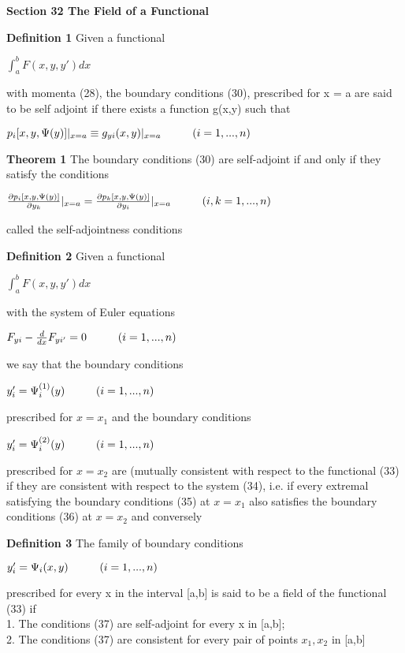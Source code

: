 \documentclass{article}
\newcommand\tab[1][1cm]{\hspace*{#1}}
\begin{document}
\textbf {Section 32 The Field of a Functional}

\textbf {Definition 1} Given a functional
\begin{center}
$\int_a^b F(x, y, y') dx$
\end{center}
with momenta (28), the boundary conditions (30), prescribed for x = a are said to be self adjoint if there exists a function g(x,y) such that 
\begin{center}
$p_i[x,y, \Psi(y)]|_{x=a} \equiv g_{yi}(x,y)|_{x=a} \tab (i = 1,...,n)$
\end{center}

\textbf {Theorem 1} The boundary conditions (30) are self-adjoint if and only if they satisfy the conditions
\begin{center}
$\frac{\partial p_i [x, y, \Psi(y)]}{\partial y_k} |_{x=a} = \frac{\partial p_k [x, y, \Psi(y)]}{\partial y_i} |_{x = a} \tab (i, k = 1,...,n)$
\end{center}
called the self-adjointness conditions

\textbf {Definition 2} Given a functional
\begin{center}
$\int_a^b F(x,y,y') dx$
\end{center}
with the system of Euler equations
\begin{center}
$F_{yi} - \frac{d}{dx} F_{yi'} = 0 \tab (i = 1,...,n)$
\end{center}
we say that the boundary conditions 
\begin{center}
$y'_i = \Psi_i^{(1)}(y) \tab (i = 1,...,n)$
\end{center}
prescribed for $x = x_1$ and the boundary conditions
\begin{center}
$y'_i = \Psi_i^{(2)}(y) \tab (i = 1,...,n)$
\end{center}
prescribed for $x = x_2$ are (mutually consistent with respect to the functional (33) if they are consistent with respect to the system (34), i.e. if every extremal satisfying the boundary conditions (35) at $x = x_1$ also satisfies the boundary conditions (36) at $x = x_2$ and conversely

\textbf {Definition 3} The family of boundary conditions
\begin{center}
$y'_i = \Psi_i (x,y) \tab (i = 1,...,n)$
\end{center}
prescribed for every x in the interval [a,b] is said to be a field of the functional (33) if \\
1. The conditions (37) are self-adjoint for every x in [a,b]; \\
2. The conditions (37) are consistent for every pair of points $x_1, x_2$ in [a,b]
\end{document}
